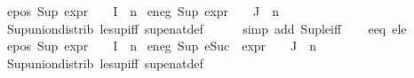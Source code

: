 \begin{isabellebody}
\ e{}{\isacharunderscore}{\kern0pt}pos{\isacharcolon}{\kern0pt}\ {\isachardoublequoteopen}Sup\ {\isacharparenleft}{\kern0pt}{\isacharparenleft}{\kern0pt}expr{\isacharunderscore}{\kern0pt}{}\ {\isasymcirc}\ {\isasymPhi}{\isacharparenright}{\kern0pt}\ {\isacharbackquote}{\kern0pt}\ I{\isacharparenright}{\kern0pt}\ {\isacharless}{\kern0pt}{\isacharequal}{\kern0pt}\ n{}{\isachardoublequoteclose}\isanewline
{}\ e{}{\isacharunderscore}{\kern0pt}neg{\isacharcolon}{\kern0pt}\ {\isachardoublequoteopen}Sup\ {\isacharparenleft}{\kern0pt}{\isacharparenleft}{\kern0pt}expr{\isacharunderscore}{\kern0pt}{}\ {\isasymcirc}\ {\isasymPhi}{\isacharparenright}{\kern0pt}\ {\isacharbackquote}{\kern0pt}\ J{\isacharparenright}{\kern0pt}\ {\isacharless}{\kern0pt}{\isacharequal}{\kern0pt}\ n{}{\isachardoublequoteclose}\isanewline
\ \ \ \ \isamarkupfalse%
\ Sup{\isacharunderscore}{\kern0pt}union{\isacharunderscore}{\kern0pt}distrib\ le{\isacharunderscore}{\kern0pt}sup{\isacharunderscore}{\kern0pt}iff\ sup{\isacharunderscore}{\kern0pt}enat{\isacharunderscore}{\kern0pt}def\isanewline
\ \ \ \ \isamarkupfalse%
\ {\isacharparenleft}{\kern0pt}simp\ add{\isacharcolon}{\kern0pt}\ Sup{\isacharunderscore}{\kern0pt}le{\isacharunderscore}{\kern0pt}iff{\isacharparenright}{\kern0pt}{\isacharplus}{\kern0pt}\isanewline
\isanewline
\ \ \isamarkupfalse%
\ e{}{\isacharunderscore}{\kern0pt}eq\ e{}{\isacharunderscore}{\kern0pt}le\ \isamarkupfalse%
\ e{}{\isacharunderscore}{\kern0pt}pos{\isacharcolon}{\kern0pt}\ {\isachardoublequoteopen}Sup\ {\isacharparenleft}{\kern0pt}{\isacharparenleft}{\kern0pt}expr{\isacharunderscore}{\kern0pt}{}\ {\isasymcirc}\ {\isasymPhi}{\isacharparenright}{\kern0pt}\ {\isacharbackquote}{\kern0pt}\ I{\isacharparenright}{\kern0pt}\ {\isasymle}\ n{}{\isachardoublequoteclose}\isanewline
{}\ e{}{\isacharunderscore}{\kern0pt}neg{\isacharcolon}{\kern0pt}\ {\isachardoublequoteopen}Sup\ {\isacharparenleft}{\kern0pt}{\isacharparenleft}{\kern0pt}eSuc\ {\isasymcirc}\ expr{\isacharunderscore}{\kern0pt}{}\ {\isasymcirc}\ {\isasymPhi}{\isacharparenright}{\kern0pt}\ {\isacharbackquote}{\kern0pt}\ J{\isacharparenright}{\kern0pt}\ {\isasymle}\ n{}{\isachardoublequoteclose}\isanewline
\ \ \ \ \isamarkupfalse%
\ Sup{\isacharunderscore}{\kern0pt}union{\isacharunderscore}{\kern0pt}distrib\ le{\isacharunderscore}{\kern0pt}sup{\isacharunderscore}{\kern0pt}iff\ sup{\isacharunderscore}{\kern0pt}enat{\isacharunderscore}{\kern0pt}def\isanewline

\end{isabellebody}
